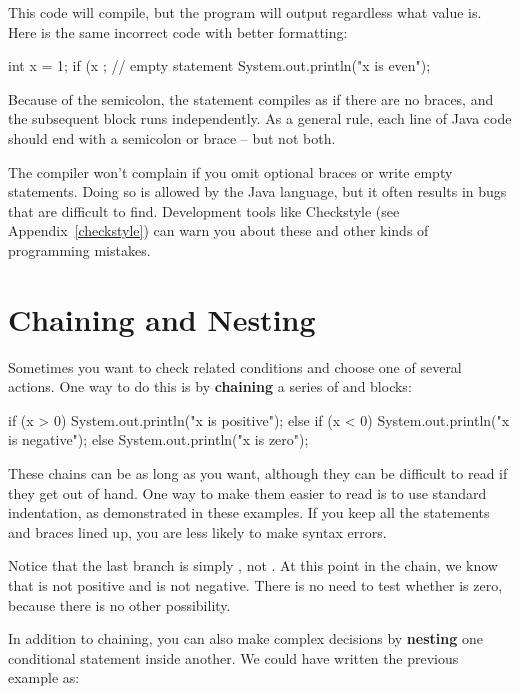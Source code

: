 This code will compile, but the program will output  regardless what value  is.
Here is the same incorrect code with better formatting:

\begin{code}
int x = 1;
if (x %
    ;  // empty statement
{
    System.out.println("x is even");
}
\end{code}

Because of the semicolon, the  statement compiles as if there are no braces, and the subsequent block runs independently.
As a general rule, each line of Java code should end with a semicolon or brace -- but not both.

The compiler won't complain if you omit optional braces or write empty statements.
Doing so is allowed by the Java language, but it often results in bugs that are difficult to find.
Development tools like Checkstyle (see Appendix~\ref{checkstyle}) can warn you about these and other kinds of programming mistakes.


\section{Chaining and Nesting}


Sometimes you want to check related conditions and choose one of several actions.
One way to do this is by {\bf chaining} a series of  and  blocks:

\begin{code}
if (x > 0) {
    System.out.println("x is positive");
} else if (x < 0) {
    System.out.println("x is negative");
} else {
    System.out.println("x is zero");
}
\end{code}

These chains can be as long as you want, although they can be difficult to read if they get out of hand.
One way to make them easier to read is to use standard indentation, as demonstrated in these examples.
If you keep all the statements and braces lined up, you are less likely to make syntax errors.

Notice that the last branch is simply , not .
At this point in the chain, we know that  is not positive and  is not negative.
There is no need to test whether  is zero, because there is no other possibility.


In addition to chaining, you can also make complex decisions by {\bf nesting} one conditional statement inside another.
We could have written the previous example as:


